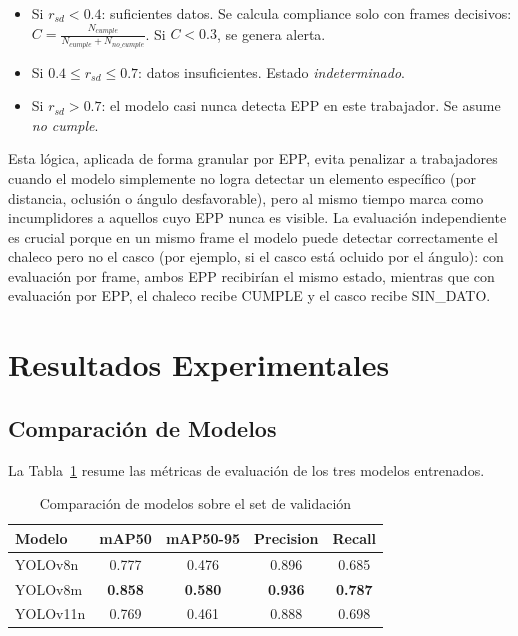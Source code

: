 \documentclass[conference, 10pt]{IEEEtran}
\begin{document}
\begin{itemize}
    \item Si $r_{sd} < 0.4$: suficientes datos. Se calcula compliance solo con frames decisivos: $C = \frac{N_{cumple}}{N_{cumple} + N_{no\_cumple}}$. Si $C < 0.3$, se genera alerta.
    \item Si $0.4 \leq r_{sd} \leq 0.7$: datos insuficientes. Estado \textit{indeterminado}.
    \item Si $r_{sd} > 0.7$: el modelo casi nunca detecta EPP en este trabajador. Se asume \textit{no cumple}.
\end{itemize}

Esta lógica, aplicada de forma granular por EPP, evita penalizar a trabajadores cuando el modelo simplemente no logra detectar un elemento específico (por distancia, oclusión o ángulo desfavorable), pero al mismo tiempo marca como incumplidores a aquellos cuyo EPP nunca es visible. La evaluación independiente es crucial porque en un mismo frame el modelo puede detectar correctamente el chaleco pero no el casco (por ejemplo, si el casco está ocluido por el ángulo): con evaluación por frame, ambos EPP recibirían el mismo estado, mientras que con evaluación por EPP, el chaleco recibe CUMPLE y el casco recibe SIN\_DATO.

\section{Resultados Experimentales}

\subsection{Comparación de Modelos}

La Tabla~\ref{tab:modelos} resume las métricas de evaluación de los tres modelos entrenados.

\begin{table}[h]
\centering
\caption{Comparación de modelos sobre el set de validación}
\label{tab:modelos}
\begin{tabular}{@{}lcccc@{}}
\toprule
\textbf{Modelo} & \textbf{mAP50} & \textbf{mAP50-95} & \textbf{Precision} & \textbf{Recall} \\
\midrule
YOLOv8n  & 0.777 & 0.476 & 0.896 & 0.685 \\
YOLOv8m  & \textbf{0.858} & \textbf{0.580} & \textbf{0.936} & \textbf{0.787} \\
YOLOv11n & 0.769 & 0.461 & 0.888 & 0.698 \\
\bottomrule
\end{tabular}
\end{table}
\end{document}
